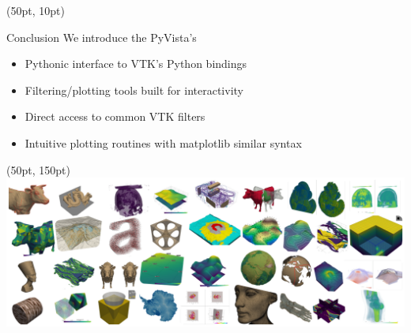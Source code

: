 \documentclass[aspectratio=169,12pt]{beamer}
\begin{document}
\begin{frame}[fragile]
\begin{textblock*}{800pt}(50pt, 10pt)
\begin{block}{Conclusion}
We introduce the PyVista's
\begin{itemize}
\item Pythonic interface to VTK’s Python bindings
\item Filtering/plotting tools built for interactivity
\item Direct access to common VTK filters
\item Intuitive plotting routines with matplotlib similar syntax
\end{itemize}
\end{block}
\end{textblock*}
\begin{textblock*}{800pt}(50pt, 150pt)
\includegraphics[width=0.50\linewidth]{pyvista_banner_small.png}
\end{textblock*}
\end{frame}
\end{document}
